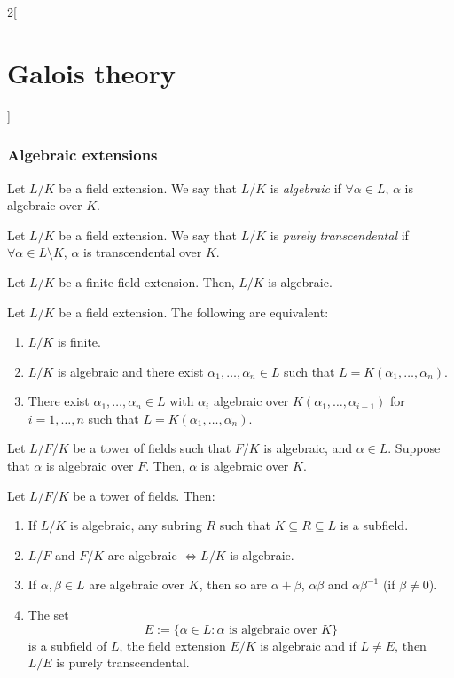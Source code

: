 \documentclass[../../../main_math.tex]{subfiles}
\begin{document}
\begin{multicols}{2}[\section{Galois theory}]
  \subsubsection{Algebraic extensions}
  \begin{definition}
    Let $L/K$ be a field extension. We say that $L/K$ is \emph{algebraic} if $\forall\alpha\in L$, $\alpha$ is algebraic over $K$.
  \end{definition}
  \begin{definition}
    Let $L/K$ be a field extension. We say that $L/K$ is \emph{purely transcendental} if $\forall\alpha\in L\setminus K$, $\alpha$ is transcendental over $K$.
  \end{definition}
  \begin{lemma}
    Let $L/K$ be a finite field extension. Then, $L/K$ is algebraic.
  \end{lemma}
  \begin{proposition}
    Let $L/K$ be a field extension. The following are equivalent:
    \begin{enumerate}
      \item $L/K$ is finite.
      \item $L/K$ is algebraic and there exist $\alpha_1,\ldots,\alpha_n\in L$ such that $L=K(\alpha_1,\ldots,\alpha_n)$.
      \item There exist $\alpha_1,\ldots,\alpha_n\in L$ with $\alpha_i$ algebraic over $K(\alpha_1,\ldots,\alpha_{i-1})$ for $i=1,\ldots,n$ such that $L=K(\alpha_1,\ldots,\alpha_n)$.
    \end{enumerate}
  \end{proposition}
  \begin{proposition}
    Let $L/F/K$ be a tower of fields such that $F/K$ is algebraic, and $\alpha\in L$. Suppose that $\alpha$ is algebraic over $F$. Then, $\alpha$ is algebraic over $K$.
  \end{proposition}
  \begin{proposition}
    Let $L/F/K$ be a tower of fields. Then:
    \begin{enumerate}
      \item If $L/K$ is algebraic, any subring $R$ such that $K\subseteq R\subseteq L$ is a subfield.
      \item $L/F$ and $F/K$ are algebraic $\iff L/K$ is algebraic.
      \item If $\alpha,\beta\in L$ are algebraic over $K$, then so are $\alpha+\beta$, $\alpha\beta$ and $\alpha\beta^{-1}$ (if $\beta\ne 0$).
      \item The set $$E:=\{\alpha\in L:\alpha\text{ is algebraic over }K\}$$ is a subfield of $L$, the field extension $E/K$ is algebraic and if $L\ne E$, then $L/E$ is purely transcendental.
    \end{enumerate}
  \end{proposition}

\end{multicols}
\end{document}
